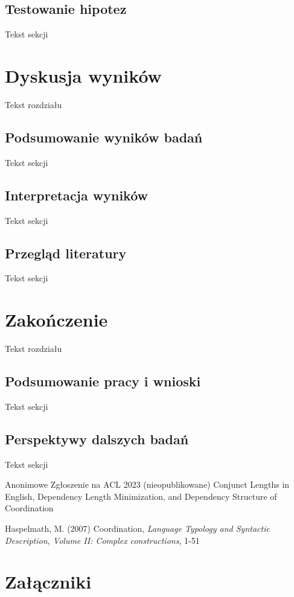 \documentclass[licencjacka]{pracamgr_Kogni}
\begin{document}
\section{Testowanie hipotez}
Tekst sekcji

\chapter{Dyskusja wyników}
Tekst rozdziału
\section{Podsumowanie wyników badań}
Tekst sekcji
\section{Interpretacja wyników}
Tekst sekcji
\section{Przegląd literatury}
Tekst sekcji

\chapter{Zakończenie}
Tekst rozdziału
\section{Podsumowanie pracy i wnioski}
Tekst sekcji
\section{Perspektywy dalszych badań}
Tekst sekcji

\begin{thebibliography}{99}

Anonimowe Zgłoszenie na ACL 2023 (nieopublikowane) Conjunct Lengths in English, Dependency Length Minimization, and Dependency Structure of Coordination

Haspelmath, M. (2007) Coordination, \textit{Language Typology and Syntactic Description, Volume II: Complex constructions}, 1-51

\end{thebibliography}


\chapter*{Załączniki}
\end{document}
